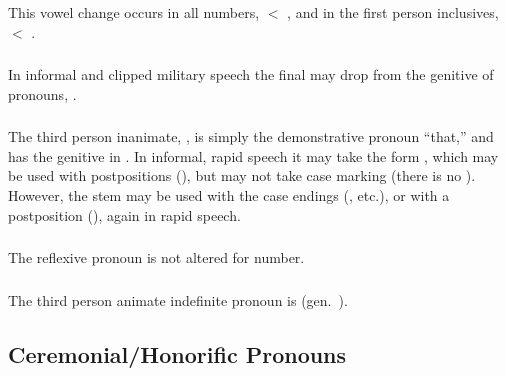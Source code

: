 \noindent This vowel change occurs in all numbers,  $<$
, and in the first person inclusives,  $<$ .

\subsubsection{} In informal and clipped military speech the final
 may drop from the genitive of pro\-nouns, .\label{morph:pron:gen-clipped} 

\subsubsection{} The third person inanimate, , is simply the
demonstrative pronoun ``that,'' and has the genitive in .
In informal, rapid speech it may take the form , which
may be used with postpositions (), but may not take case
marking (there is no ).  However, the stem  may be
used with the case endings (, etc.), or with a
postposition (), again in rapid speech.
\label{morph:pron:tsa}

\subsubsection{} The reflexive pronoun  is not altered for
number. 

\subsubsection{} The third person animate indefinite pronoun is
 (gen.\ ).

\subsection{Ceremonial/Honorific Pronouns}

